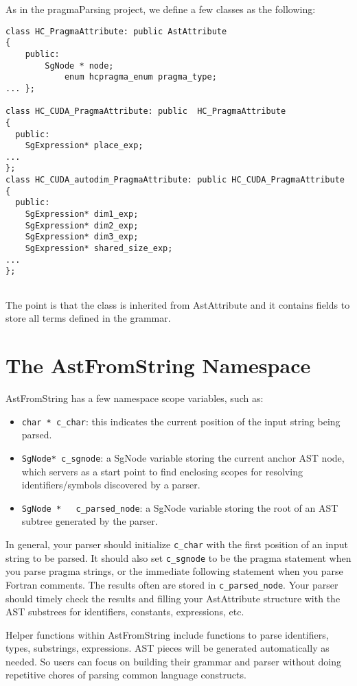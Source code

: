 As in the pragmaParsing project, we define a few classes as the following:

\begin{verbatim}
class HC_PragmaAttribute: public AstAttribute
{
    public:
        SgNode * node;
            enum hcpragma_enum pragma_type;
... };

class HC_CUDA_PragmaAttribute: public  HC_PragmaAttribute
{
  public:
    SgExpression* place_exp;
...
};
class HC_CUDA_autodim_PragmaAttribute: public HC_CUDA_PragmaAttribute
{
  public:
    SgExpression* dim1_exp;
    SgExpression* dim2_exp;
    SgExpression* dim3_exp;
    SgExpression* shared_size_exp;
...
};
            
\end{verbatim}
The point is that the class is inherited from AstAttribute and it contains fields to store all terms defined in the grammar. 

\section{The AstFromString Namespace}
AstFromString has a few namespace scope variables, such as:
\begin{itemize}
\item \lstinline{char * c_char}: this indicates the current position of the input string being parsed.
\item \lstinline{SgNode* c_sgnode}: a SgNode variable storing the current anchor AST node, which servers as a start point to find enclosing scopes for resolving identifiers/symbols discovered by a parser. 
\item \lstinline{SgNode *   c_parsed_node}: a SgNode variable storing the root of an AST subtree generated by the parser.
\end{itemize}

In general, your parser should initialize \lstinline{c_char} with the first position of an input string to be parsed. 
It should also set \lstinline{c_sgnode} to be the pragma statement  when you parse pragma strings,  or the immediate following statement when you parse Fortran comments. 
The results often are stored in \lstinline{c_parsed_node}. Your parser should timely check the results and filling your AstAttribute structure with the AST substrees for identifiers, constants, expressions, etc.

Helper functions within AstFromString include functions to parse identifiers, types, substrings, expressions. AST pieces will be generated automatically as needed. So users can focus on building their grammar and parser without doing repetitive chores of parsing common language constructs. 

